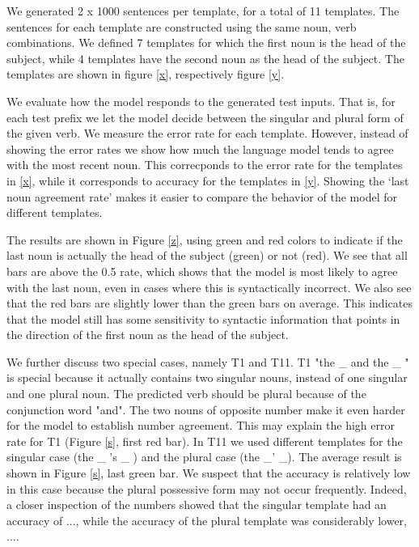 \begin{multicols}{2}
We generated 2 x 1000 sentences per template,
for a total of 11 templates.
The sentences for each template are constructed using the same
noun, verb combinations.
We defined 7 templates for which the first noun is the head of the subject,
while 4 templates have the second noun as the head of the subject.
The templates are shown in figure \ref{x}, respectively figure \ref{y}.

We evaluate how the model responds to the generated test inputs.
That is, for each test prefix we let the model decide between 
the singular and plural form of the given verb. 
We measure the error rate for each template.
However, instead of showing the error rates we
show how much the language model tends to agree with the most recent noun.
This correcponds to the error rate for the templates in \ref{x},
while it corresponds to accuracy for the templates in \ref{y}.
Showing the `last noun agreement rate' makes it easier
to compare the behavior of the model for different templates.

The results are shown in Figure \ref{z},
using green and red colors to indicate if 
the last noun is actually the head of the subject (green)
or not (red). 
%
We see that all bars are above the 0.5 rate,
which shows that the model is most
likely to agree with the last noun,
even in cases where this is syntactically incorrect. 
%
We also see that the red bars are slightly
lower than the green bars on average.
This indicates that the model still has some sensitivity
to syntactic information that points in the direction 
of the first noun as the head of the subject.
%

%
We further discuss two special cases,
namely T1 and T11.
T1 "the \_ and the \_ " is special because it 
actually contains two singular nouns,
instead of one singular and one plural noun. 
The predicted verb should be plural because of the
conjunction word "and".
The two nouns of opposite number make it even harder for the model
to establish number agreement. 
This may explain the high error rate
for T1 (Figure \ref{s}, first red bar).
%
In T11 we used different templates for the singular case
(the \_ 's \_ ) and the plural case (the \_' \_).
The average result is shown in 
Figure \ref{s}, last green bar.
We suspect that the accuracy is relatively
low in this case because the plural possessive form
may not occur frequently. 
Indeed, a closer inspection of the numbers showed that
the singular template had an accuracy
of ..., while the accuracy of the plural template
was considerably lower, ....
%


\end{multicols}
